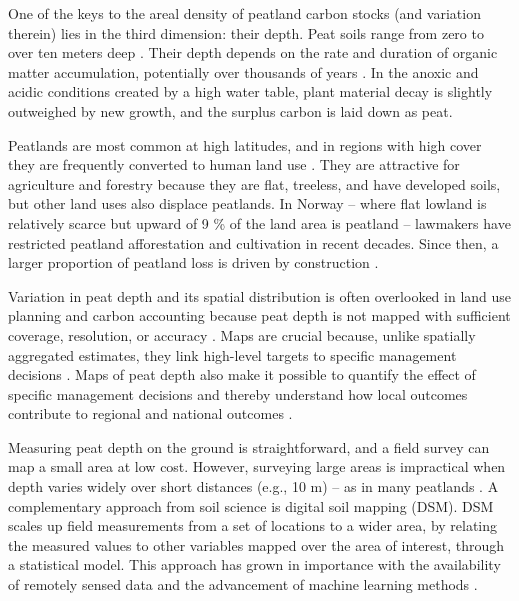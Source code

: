 \documentclass[soil, manuscript]{copernicus}
\begin{document}
One of the keys to the areal density of peatland carbon stocks (and variation therein) lies in the third dimension: their depth.
Peat soils range from zero to over ten meters deep \citep{widyastutiPEATGRIDSMappingThickness2024}.
Their depth depends on the rate and duration of organic matter accumulation, potentially over thousands of years \citep{loiselDatabaseSynthesisNorthern2014, joostenRolePeatlandsClimate2016}.
In the anoxic and acidic conditions created by a high water table, plant material decay is slightly outweighed by new growth, and the surplus carbon is laid down as peat.

Peatlands are most common at high latitudes, and in regions with high cover they are frequently converted to human land use \citep{unepGlobalPeatlandsAssessment2022}.
They are attractive for agriculture and forestry because they are flat, treeless, and have developed soils, but other land uses also displace peatlands.
In Norway -- where flat lowland is relatively scarce but upward of 9 \% of the land area is peatland \citep{brynLandCoverNorway2018, bakkestuenDelineationWetlandAreas2023} -- lawmakers have restricted peatland afforestation and cultivation in recent decades.
Since then, a larger proportion of peatland loss is driven by construction \citep{flagetMyrMellomLokal2024}.

Variation in peat depth and its spatial distribution is often overlooked in land use planning and carbon accounting because peat depth is not mapped with sufficient coverage, resolution, or accuracy \citep{beilmanPeatCarbonStocks2008, hastieRisksCarbonStorage2022, unepGlobalPeatlandsAssessment2022}.
Maps are crucial because, unlike spatially aggregated estimates, they link high-level targets to specific management decisions \citep{oecdOECDEnvironmentalPerformance2022}.
Maps of peat depth also make it possible to quantify the effect of specific management decisions and thereby understand how local outcomes contribute to regional and national outcomes \citep{oecdOECDEnvironmentalPerformance2022}.

Measuring peat depth on the ground is straightforward, and a field survey can map a small area at low cost.
However, surveying large areas is impractical when depth varies widely over short distances (e.g., 10 m) -- as in many peatlands \citep{torppaStatisticalApproachDetermining2011, proulx-mcinnisReviewGroundpenetratingRadar2013, henrionMappingMonitoringPeatlands2024}.
A complementary approach from soil science is digital soil mapping (DSM).
DSM scales up field measurements from a set of locations to a wider area, by relating the measured values to other variables mapped over the area of interest, through a statistical model.
This approach has grown in importance with the availability of remotely sensed data and the advancement of machine learning methods \citep{minasnyDigitalMappingPeatlands2019, wadouxMachineLearningDigital2020}.
\end{document}
